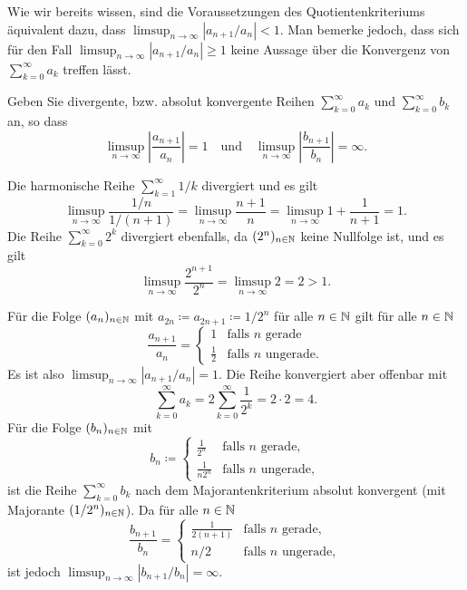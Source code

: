 \documentclass[a4paper,10pt]{article}
\begin{document}
Wie wir bereits wissen, sind die Voraussetzungen des Quotientenkriteriums äquivalent dazu, dass $\limsup_{n \to \infty} |a_{n+1}/a_n| < 1$. Man bemerke jedoch, dass sich für den Fall $\limsup_{n \to \infty} |a_{n+1}/a_n| \geq 1$ keine Aussage über die Konvergenz von $\sum_{k=0}^\infty a_k$ treffen lässt.


\begin{question}
 Geben Sie divergente, bzw. absolut konvergente Reihen $\sum_{k=0}^\infty a_k$ und $\sum_{k=0}^\infty b_k$ an, so dass 
 \[
  \limsup_{n \to \infty} \left|\frac{a_{n+1}}{a_n}\right| = 1
  \quad
  \text{und}
  \quad
  \limsup_{n \to \infty} \left|\frac{b_{n+1}}{b_n}\right| = \infty.
 \]
\end{question}
\begin{solution}
 Die harmonische Reihe $\sum_{k=1}^\infty 1/k$ divergiert und es gilt
 \[
  \limsup_{n \to \infty} \frac{1/n}{1/(n+1)}
  = \limsup_{n \to \infty} \frac{n+1}{n}
  = \limsup_{n \to \infty} 1+\frac{1}{n+1}
  = 1.
 \]
 Die Reihe $\sum_{k=0}^\infty 2^k$ divergiert ebenfalls, da $(2^n)_{n \in \mathbb{N}}$ keine Nullfolge ist, und es gilt
 \[
  \limsup_{n \to \infty} \frac{2^{n+1}}{2^n}
  = \limsup_{n \to \infty} 2
  = 2
  > 1.
 \]

 Für die Folge $(a_n)_{n \in \mathbb{N}}$ mit $a_{2n} \coloneqq a_{2n+1} \coloneqq 1/2^n$ für alle $n \in \mathbb{N}$ gilt für alle $n \in \mathbb{N}$
 \[
  \frac{a_{n+1}}{a_n} =
  \begin{cases}
            1  & \text{falls $n$ gerade} \\
   \frac{1}{2} & \text{falls $n$ ungerade}.
  \end{cases}
 \]
 Es ist also $\limsup_{n \to \infty} |a_{n+1}/a_n| = 1$. Die Reihe konvergiert aber offenbar mit
 \[
  \sum_{k=0}^\infty a_k
  = 2 \sum_{k=0}^\infty \frac{1}{2^k}
  = 2 \cdot 2
  = 4.
 \]
 Für die Folge $(b_n)_{n \in \mathbb{N}}$ mit
 \[
  b_n \coloneqq
  \begin{cases}
     \frac{1}{2^n} & \text{falls $n$ gerade}, \\
   \frac{1}{n 2^n} & \text{falls $n$ ungerade},
  \end{cases}
 \]
 ist die Reihe $\sum_{k=0}^\infty b_k$ nach dem Majorantenkriterium absolut konvergent (mit Majorante $(1/2^n)_{n \in \mathbb{N}}$). Da für alle $n \in \mathbb{N}$
 \[
  \frac{b_{n+1}}{b_n} =
  \begin{cases}
   \frac{1}{2(n+1)} & \text{falls $n$ gerade}, \\
                n/2 & \text{falls $n$ ungerade},
  \end{cases}
 \]
 ist jedoch $\limsup_{n \to \infty} |b_{n+1}/b_n| = \infty$.
\end{solution}
\end{document}
